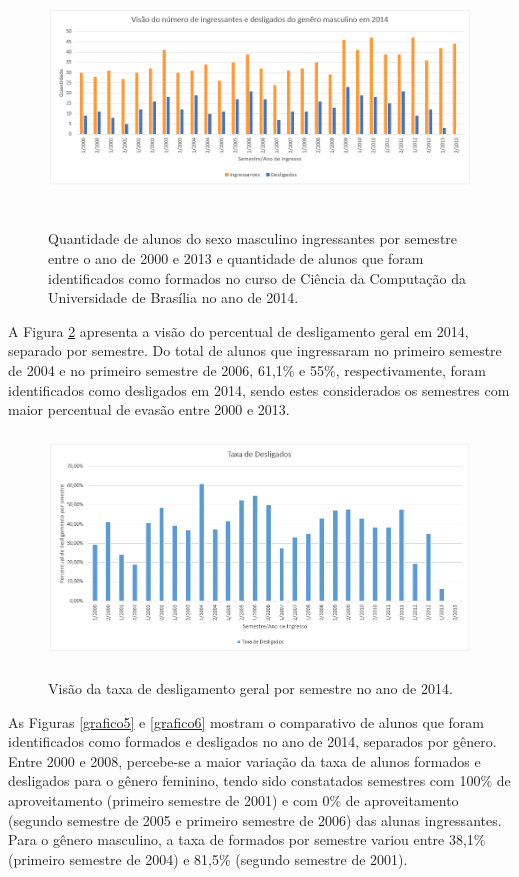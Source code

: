 \begin{figure}[!h]
	\centering
	{\includegraphics[width=16cm, height=6cm]{images/grafico4}}
	\caption {Quantidade de alunos do sexo masculino ingressantes por semestre  entre o ano de 2000 e 2013 e quantidade de alunos que foram identificados como formados no curso de Ciência da Computação da Universidade de Brasília no ano de 2014.}
	\label{grafico4}
\end{figure}

A Figura \ref{grafico7} apresenta a visão do percentual de desligamento geral em 2014, separado por semestre. Do total de alunos que ingressaram no primeiro semestre de 2004 e no primeiro semestre de 2006, 61,1\% e 55\%, respectivamente, foram identificados como desligados em 2014, sendo estes considerados os semestres com maior percentual de evasão entre 2000 e 2013.

\begin{figure}[!h]
	\centering
	{\includegraphics[width=16cm, height=6cm]{images/grafico7}}
	\caption {Visão da taxa de desligamento geral por semestre no ano de 2014.}
	\label{grafico7}
\end{figure}


As Figuras \ref{grafico5} e \ref{grafico6} mostram o comparativo de alunos que foram identificados como formados e desligados no ano de 2014, separados por gênero. Entre 2000 e 2008, percebe-se a maior variação da taxa de alunos formados e desligados para o gênero feminino, tendo sido constatados semestres com 100\% de aproveitamento (primeiro semestre de 2001) e com 0\% de aproveitamento (segundo semestre de 2005 e primeiro semestre de 2006) das alunas ingressantes. Para o gênero masculino, a taxa de formados por semestre variou entre 38,1\% (primeiro semestre de 2004) e 81,5\% (segundo semestre de 2001). 

